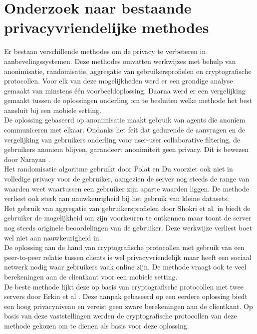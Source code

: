 \documentclass[twocolumn]{phdsymp} %
\begin{document}
\section{Onderzoek naar bestaande privacyvriendelijke methodes}
Er bestaan verschillende methodes om de privacy te verbeteren in aanbevelingssystemen. Deze methodes omvatten werkwijzes met behulp van anonimisatie, randomisatie, aggregatie van gebruikersprofielen en cryptografische protocollen. Voor elk van deze mogelijkheden werd er een grondige analyse gemaakt van minstens \'e\'en voorbeeldoplossing. Daarna werd er een vergelijking gemaakt tussen de oplossingen onderling om te besluiten welke methode het best aansluit bij een mobiele setting. \\ De oplossing gebaseerd op anonimisatie \cite{anonimisatie} maakt gebruik van agents die anoniem communiceren met elkaar. Ondanks het feit dat gedurende de aanvragen en de vergelijking van gebruikers onderling voor user-user collaborative filtering, de gebruikers anoniem blijven, garandeert anonimiteit geen privacy. Dit is bewezen door Narayan \cite{anon}.\\ Het randomisatie algoritme gebruikt door Polat en Du \cite{rand} voorziet ook niet in volledige privacy voor de gebruiker, aangezien de server nog steeds de range van waarden weet waartussen een gebruiker zijn aparte waarden liggen. De methode verliest ook sterk aan nauwkeurigheid bij het gebruik van kleine datasets.\\  Het gebruik van aggregatie van gebruikersprofielen door Shokri et al. in \cite{agg} biedt de gebruiker de mogelijkheid om zijn voorkeuren te ontkennen maar toont de server nog steeds originele beoordelingen van de gebruiker. Deze werkwijze verliest boet wel niet aan nauwkeurigheid in. \\ De oplossing aan de hand van cryptografische protocollen met gebruik van een peer-to-peer relatie tussen clients \cite{social} is wel privacyvriendelijk maar heeft een sociaal netwerk nodig waar gebruikers vaak online zijn. De methode vraagt ook te veel berekeningen aan de clientkant voor een mobiele setting.\\ De beste methode lijkt deze op basis van cryptografische protocollen met twee servers door Erkin et al \cite{dyn}. Deze aanpak gebaseerd op een eerdere oplossing \cite{erkin} biedt een hoog privacyniveau en vereist geen zware berekeningen aan de clientkant. Op basis van deze vaststellingen werden de cryptografische protocollen van deze methode gekozen om te dienen als basis voor deze oplossing.
\end{document}
